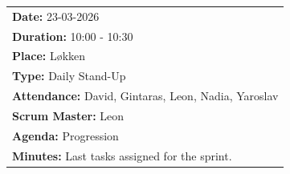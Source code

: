 \begin{table}[H]
    \centering
    \begin{tabular}{|p{15cm}|}   
        \hline
        \textbf{Date:}  23-03-2026 \\
        \textbf{Duration:} 10:00 - 10:30\\
        \textbf{Place:}  Løkken \\
        \textbf{Type:}  Daily Stand-Up\\
        \textbf{Attendance:} David, Gintaras, Leon, Nadia, Yaroslav\\
        \textbf{Scrum Master:}  Leon\\
        \textbf{Agenda:} Progression \\
        \textbf{Minutes:}  Last tasks assigned for the sprint.\\
        \hline
    \end{tabular}
\end{table}

